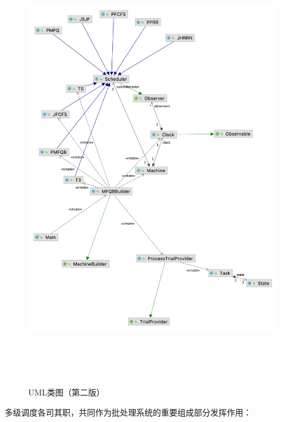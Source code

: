 \documentclass[UTF8]{ctexart}
\begin{document}
\begin{figure}[htbp]
    \centering
    \includegraphics[height=550pt]{v1-class-compat.png}
    \caption{UML类图（第二版）}
\end{figure}

多级调度各司其职，共同作为批处理系统的重要组成部分发挥作用：
\end{document}
